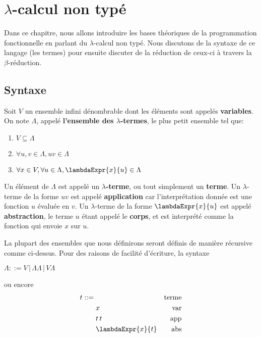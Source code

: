 \chapter{$\lambda$-calcul non typé}

Dans ce chapitre, nous allons introduire les bases théoriques de la
programmation fonctionnelle en parlant du $\lambda$-calcul non typé.
Nous discutons de la syntaxe de ce langage (les termes) pour ensuite discuter de
la réduction de ceux-ci à travers la $\beta$-réduction.

\section{Syntaxe}

\begin{definition} 
  Soit $V$ un ensemble infini dénombrable dont les éléments sont appelés \textbf{variables}. On note $\Lambda$, appelé \textbf{l'ensemble des $\lambda$-termes}, le plus petit
  ensemble tel que:
  \begin{enumerate}
    \item $V \subseteq \Lambda$
    \item $\forall u, v \in \Lambda, uv \in \Lambda$
    \item $\forall x \in V, \forall u \in \Lambda, \lambdaExpr{x}{u} \in \Lambda$
  \end{enumerate}
\end{definition}

Un élément de $\Lambda$ est appelé un \textbf{$\lambda$-terme}, ou tout
simplement un \textbf{terme}.
Un $\lambda$-terme de la forme $uv$ est appelé \textbf{application} car
l'interprétation donnée est une fonction $u$ évaluée en $v$.
Un $\lambda$-terme de la forme $\lambdaExpr{x}{u}$ est appelé
\textbf{abstraction}, le terme $u$ étant appelé le \textbf{corps}, et est interprété comme la fonction qui envoie
$x$ sur $u$.

La plupart des ensembles que nous définirons seront définis de manière récursive
comme ci-dessus.
Pour des raisons de facilité d'écriture, la syntaxe
\begin{center}
  \begin{math}
    \Lambda ::= V \, | \, \Lambda \Lambda \, | \, V \Lambda
  \end{math}
\end{center}

ou encore
\begin{align*}
  t ::= & \, & \text{terme} \\
        & \; x & \text{var} \\
        & \; t \, t & \text{app} \\
        & \; \lambdaExpr{x}{t} & \text{abs}
\end{align*}

